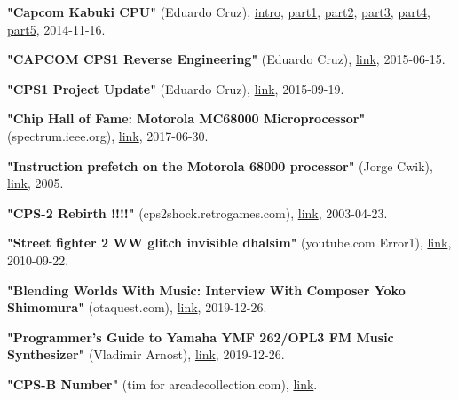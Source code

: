 \begin{thebibliography}{999}
  \textbf{"Capcom Kabuki CPU"} (Eduardo Cruz),
  \href{ http://arcadehacker.blogspot.com/2014/11/capcom-kabuki-cpu-intro.html}{intro},
  \href{http://arcadehacker.blogspot.com/2014/11/capcom-kabuki-cpu-part-1.html}{part1},
  \href{http://arcadehacker.blogspot.com/2014/11/capcom-kabuki-cpu-part-2.html}{part2},
  \href{http://arcadehacker.blogspot.com/2014/11/capcom-kabuki-cpu-part-3.html}{part3},
  \href{http://arcadehacker.blogspot.com/2014/11/capcom-kabuki-cpu-part-4.html}{part4},
  \href{http://arcadehacker.blogspot.com/2014/11/capcom-kabuki-cpu-part-5.html}{part5},
  2014-11-16.

  \textbf{"CAPCOM CPS1 Reverse Engineering"} (Eduardo Cruz),
  \href{https://www.youtube.com/watch?v=IBZc__9sM28}{link},
  2015-06-15.

  \textbf{"CPS1 Project Update"} (Eduardo Cruz),
  \href{http://arcadehacker.blogspot.com/2015/09/project-update.html}{link},
  2015-09-19.

  \textbf{"Chip Hall of Fame: Motorola MC68000 Microprocessor"} (spectrum.ieee.org),
  \href{https://spectrum.ieee.org/tech-history/silicon-revolution/chip-hall-of-fame-motorola-mc68000-microprocessor}{link},
  2017-06-30.

  \textbf{"Instruction prefetch on the Motorola 68000 processor"} (Jorge Cwik),
  \href{http://pasti.fxatari.com/68kdocs/68kPrefetch.html}{link},
  2005.
  

  \textbf{"CPS-2 Rebirth !!!!"} (cps2shock.retrogames.com),
  \href{https://web.archive.org/web/20060812042251/http://cps2shock.retrogames.com/wip.html}{link},
  2003-04-23.

  \textbf{"Street fighter 2 WW glitch invisible dhalsim"} (youtube.com Error1),
  \href{https://www.youtube.com/watch?v=qEFPzcOK_uQ}{link},
  2010-09-22.

  \textbf{"Blending Worlds With Music: Interview With Composer Yoko Shimomura"} (otaquest.com),
  \href{https://www.otaquest.com/yoko-shimomura-interview/}{link},
  2019-12-26.

  \textbf{"Programmer's Guide to Yamaha YMF 262/OPL3 FM Music Synthesizer"} (Vladimir Arnost),
  \href{https://www.fit.vutbr.cz/~arnost/opl/opl3.html}{link},
  2019-12-26.

  \textbf{"CPS-B Number"} (tim for arcadecollection.com),
  \href{http://www.arcadecollecting.com/info/cps-b_numbers.html}{link}.


\end{thebibliography}
